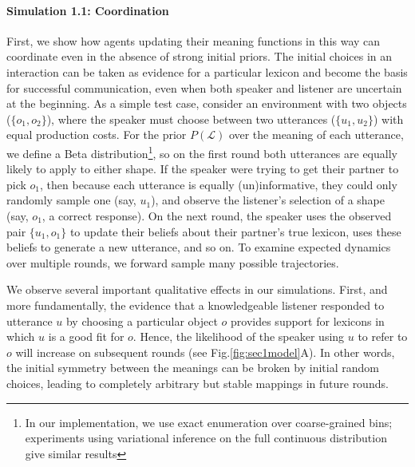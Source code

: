 \paragraph{Simulation 1.1: Coordination}

First, we show how agents updating their meaning functions in this way can coordinate even in the absence of strong initial priors. 
The initial choices in an interaction can be taken as evidence for a particular lexicon and become the basis for successful communication, even when both speaker and listener are uncertain at the beginning.
As a simple test case, consider an environment with two objects ($\{o_1, o_2\}$), where the speaker must choose between two utterances ($\{u_1, u_2\}$) with equal production costs. 
For the prior $P(\mathcal{L})$ over the meaning of each utterance, we define a Beta distribution\footnote{In our implementation, we use exact enumeration over coarse-grained bins; experiments using variational inference on the full continuous distribution give similar results}, so on the first round both utterances are equally likely to apply to either shape. 
If the speaker were trying to get their partner to pick $o_1$, then because each utterance is equally (un)informative, they could only randomly sample one (say, $u_1$), and observe the listener's selection of a shape (say, $o_1$, a correct response). 
On the next round, the speaker uses the observed pair $\{u_1, o_1\}$ to update their beliefs about their partner's true lexicon, uses these beliefs to generate a new utterance, and so on. 
To examine expected dynamics over multiple rounds, we forward sample many possible trajectories.

We observe several important qualitative effects in our simulations. 
First, and more fundamentally, the evidence that a knowledgeable listener responded to utterance $u$ by choosing a particular object $o$ provides support for lexicons in which $u$ is a good fit for $o$. 
Hence, the likelihood of the speaker using $u$ to refer to $o$ will increase on subsequent rounds (see Fig.\ref{fig:sec1model}A). 
In other words, the initial symmetry between the meanings can be broken by initial random choices, leading to completely arbitrary but stable mappings in future rounds. 

